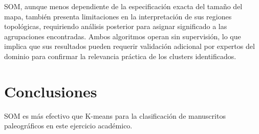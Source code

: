 \documentclass[12pt,a4paper]{article}
\begin{document}
SOM, aunque menos dependiente de la especificación exacta del tamaño del mapa, también presenta limitaciones en la interpretación de sus regiones topológicas, requiriendo análisis posterior para asignar significado a las agrupaciones encontradas. Ambos algoritmos operan sin supervisión, lo que implica que sus resultados pueden requerir validación adicional por expertos del dominio para confirmar la relevancia práctica de los clusters identificados.

\section{Conclusiones}

SOM es más efectivo que K-means para la clasificación de manuscritos paleográficos en este ejercicio académico.



\end{document}

